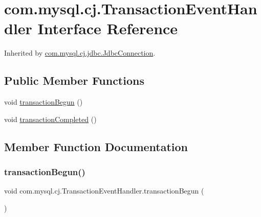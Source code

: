 \hypertarget{interfacecom_1_1mysql_1_1cj_1_1_transaction_event_handler}{}\section{com.\+mysql.\+cj.\+Transaction\+Event\+Handler Interface Reference}
\label{interfacecom_1_1mysql_1_1cj_1_1_transaction_event_handler}


Inherited by \mbox{\hyperlink{interfacecom_1_1mysql_1_1cj_1_1jdbc_1_1_jdbc_connection}{com.\+mysql.\+cj.\+jdbc.\+Jdbc\+Connection}}.

\subsection*{Public Member Functions}
\begin{DoxyCompactItemize}
\item 
void \mbox{\hyperlink{interfacecom_1_1mysql_1_1cj_1_1_transaction_event_handler_a4c745069ad52c307d91f62b3ebff5c01}{transaction\+Begun}} ()
\item 
void \mbox{\hyperlink{interfacecom_1_1mysql_1_1cj_1_1_transaction_event_handler_ac0775d70699a27ec6a8a7954e64b86f8}{transaction\+Completed}} ()
\end{DoxyCompactItemize}


\subsection{Member Function Documentation}
\mbox{\label{interfacecom_1_1mysql_1_1cj_1_1_transaction_event_handler_a4c745069ad52c307d91f62b3ebff5c01}} 
\subsubsection{\texorpdfstring{transaction\+Begun()}{transactionBegun()}}
{\footnotesize\ttfamily void com.\+mysql.\+cj.\+Transaction\+Event\+Handler.\+transaction\+Begun (\begin{DoxyParamCaption}{ }\end{DoxyParamCaption})}




